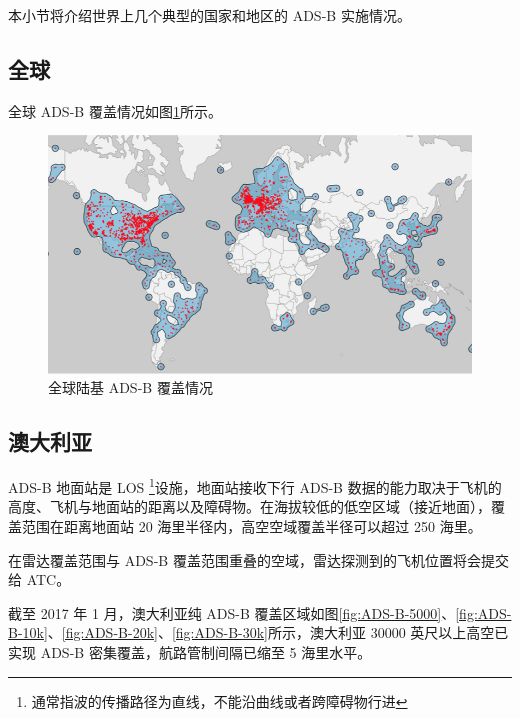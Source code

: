 本小节将介绍世界上几个典型的国家和地区的 ADS-B 实施情况。

\subsection{全球}

全球 ADS-B 覆盖情况如图\ref{fig:1ADS-B-coverage}所示。

\begin{figure}[!htb]
\centering
\includegraphics[width=14cm]{pic/1ADS-B-coverage.png}
\caption{全球陆基 ADS-B 覆盖情况\protect\footnotemark}
\label{fig:1ADS-B-coverage}
\end{figure}


\subsection{澳大利亚}

ADS-B 地面站是 LOS \footnote{通常指波的传播路径为直线，不能沿曲线或者跨障碍物行进}设施，地面站接收下行 ADS-B 数据的能力取决于飞机的高度、飞机与地面站的距离以及障碍物。在海拔较低的低空区域（接近地面），覆盖范围在距离地面站 20 海里半径内，高空空域覆盖半径可以超过 250 海里。

在雷达覆盖范围与 ADS-B 覆盖范围重叠的空域，雷达探测到的飞机位置将会提交给 \acs{ATC}。

截至 2017 年 1 月，澳大利亚纯 ADS-B 覆盖区域如图\ref{fig:ADS-B-5000}、\ref{fig:ADS-B-10k}、\ref{fig:ADS-B-20k}、\ref{fig:ADS-B-30k}所示，澳大利亚 30000 英尺以上高空已实现 ADS-B 密集覆盖，航路管制间隔已缩至 5 海里水平。

